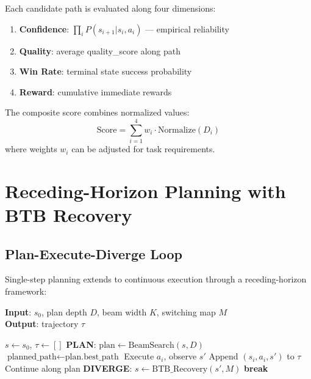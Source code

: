 \documentclass[letterpaper]{article}
\begin{document}
Each candidate path is evaluated along four dimensions:

\begin{enumerate}
    \item \textbf{Confidence}: $\prod_i P(s_{i+1}|s_i, a_i)$ — empirical reliability
    \item \textbf{Quality}: average quality\_score along path
    \item \textbf{Win Rate}: terminal state success probability
    \item \textbf{Reward}: cumulative immediate rewards
\end{enumerate}

The composite score combines normalized values:
\begin{equation}
\text{Score} = \sum_{i=1}^{4} w_i \cdot \text{Normalize}(D_i)
\end{equation}
where weights $w_i$ can be adjusted for task requirements.

\section{Receding-Horizon Planning with BTB Recovery}

\subsection{Plan-Execute-Diverge Loop}

Single-step planning extends to continuous execution through a receding-horizon framework:

\begin{algorithm}[t]
\caption{Receding-Horizon Rollout}
\label{alg:rollout}
\textbf{Input}: $s_0$, plan depth $D$, beam width $K$, switching map $M$ \\
\textbf{Output}: trajectory $\tau$
\begin{algorithmic}[1]
\STATE $s \leftarrow s_0$, $\tau \leftarrow []$
    \STATE \textbf{PLAN}: $\text{plan} \leftarrow \text{BeamSearch}(s, D)$
    \STATE $\text{planned\_path} \leftarrow \text{plan.best\_path}$
        \STATE Execute $a_i$, observe $s'$
        \STATE Append $(s_i, a_i, s')$ to $\tau$
            \STATE Continue along plan
        \ELSE
            \STATE \textbf{DIVERGE}: $s \leftarrow \text{BTB\_Recovery}(s', M)$
            \STATE \textbf{break}
        \ENDIF
    \ENDFOR
\ENDWHILE
\end{algorithmic}
\end{algorithm}
\end{document}
